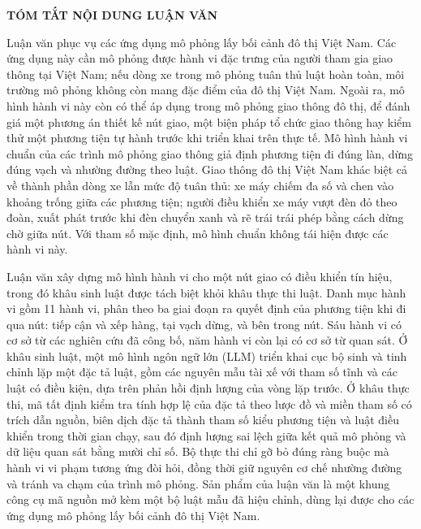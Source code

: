 \documentclass[../main.tex]{subfiles}
\begin{document}
\begin{center}
    \Large{\textbf{TÓM TẮT NỘI DUNG LUẬN VĂN}}\\
\end{center}
\vspace{0.6cm}

Luận văn phục vụ các ứng dụng mô phỏng lấy bối cảnh đô thị Việt Nam. Các ứng dụng này cần mô phỏng được hành vi đặc trưng của người tham gia giao thông tại Việt Nam; nếu dòng xe trong mô phỏng tuân thủ luật hoàn toàn, môi trường mô phỏng không còn mang đặc điểm của đô thị Việt Nam. Ngoài ra, mô hình hành vi này còn có thể áp dụng trong mô phỏng giao thông đô thị, để đánh giá một phương án thiết kế nút giao, một biện pháp tổ chức giao thông hay kiểm thử một phương tiện tự hành trước khi triển khai trên thực tế. Mô hình hành vi chuẩn của các trình mô phỏng giao thông giả định phương tiện đi đúng làn, dừng đúng vạch và nhường đường theo luật. Giao thông đô thị Việt Nam khác biệt cả về thành phần dòng xe lẫn mức độ tuân thủ: xe máy chiếm đa số và chen vào khoảng trống giữa các phương tiện; người điều khiển xe máy vượt đèn đỏ theo đoàn, xuất phát trước khi đèn chuyển xanh và rẽ trái trái phép bằng cách dừng chờ giữa nút. Với tham số mặc định, mô hình chuẩn không tái hiện được các hành vi này.

Luận văn xây dựng mô hình hành vi cho một nút giao có điều khiển tín hiệu, trong đó khâu sinh luật được tách biệt khỏi khâu thực thi luật. Danh mục hành vi gồm 11 hành vi, phân theo ba giai đoạn ra quyết định của phương tiện khi đi qua nút: tiếp cận và xếp hàng, tại vạch dừng, và bên trong nút. Sáu hành vi có cơ sở từ các nghiên cứu đã công bố, năm hành vi còn lại có cơ sở từ quan sát. Ở khâu sinh luật, một mô hình ngôn ngữ lớn (LLM) triển khai cục bộ sinh và tinh chỉnh lặp một đặc tả luật, gồm các nguyên mẫu tài xế với tham số tĩnh và các luật có điều kiện, dựa trên phản hồi định lượng của vòng lặp trước. Ở khâu thực thi, mã tất định kiểm tra tính hợp lệ của đặc tả theo lược đồ và miền tham số có trích dẫn nguồn, biên dịch đặc tả thành tham số kiểu phương tiện và luật điều khiển trong thời gian chạy, sau đó định lượng sai lệch giữa kết quả mô phỏng và dữ liệu quan sát bằng mười chỉ số. Bộ thực thi chỉ gỡ bỏ đúng ràng buộc mà hành vi vi phạm tương ứng đòi hỏi, đồng thời giữ nguyên cơ chế nhường đường và tránh va chạm của trình mô phỏng. Sản phẩm của luận văn là một khung công cụ mã nguồn mở kèm một bộ luật mẫu đã hiệu chỉnh, dùng lại được cho các ứng dụng mô phỏng lấy bối cảnh đô thị Việt Nam.
\end{document}
